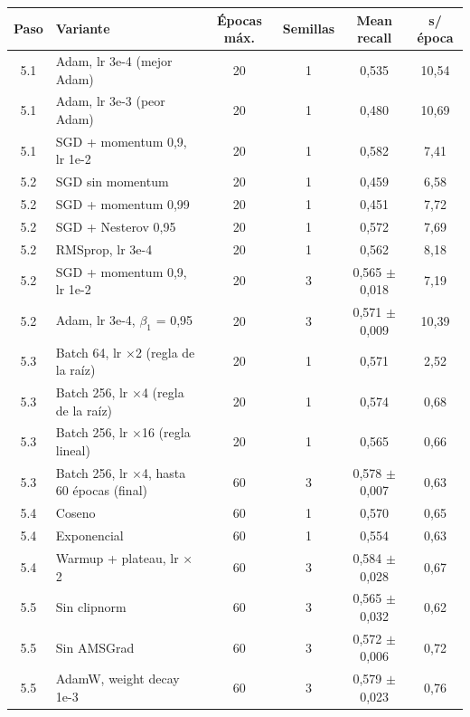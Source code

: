 \begin{tabular}{clcccc}
\toprule
Paso & Variante & Épocas máx. & Semillas & Mean recall & s/época \\
\midrule
5.1 & Adam, lr 3e-4 (mejor Adam) & 20 & 1 & 0,535 & 10,54 \\
5.1 & Adam, lr 3e-3 (peor Adam) & 20 & 1 & 0,480 & 10,69 \\
5.1 & SGD + momentum 0,9, lr 1e-2 & 20 & 1 & 0,582 & 7,41 \\
5.2 & SGD sin momentum & 20 & 1 & 0,459 & 6,58 \\
5.2 & SGD + momentum 0,99 & 20 & 1 & 0,451 & 7,72 \\
5.2 & SGD + Nesterov 0,95 & 20 & 1 & 0,572 & 7,69 \\
5.2 & RMSprop, lr 3e-4 & 20 & 1 & 0,562 & 8,18 \\
5.2 & SGD + momentum 0,9, lr 1e-2 & 20 & 3 & 0,565 $\pm$ 0,018 & 7,19 \\
5.2 & Adam, lr 3e-4, $\beta_1$ = 0,95 & 20 & 3 & 0,571 $\pm$ 0,009 & 10,39 \\
5.3 & Batch 64, lr $\times$2 (regla de la raíz) & 20 & 1 & 0,571 & 2,52 \\
5.3 & Batch 256, lr $\times$4 (regla de la raíz) & 20 & 1 & 0,574 & 0,68 \\
5.3 & Batch 256, lr $\times$16 (regla lineal) & 20 & 1 & 0,565 & 0,66 \\
5.3 & Batch 256, lr $\times$4, hasta 60 épocas (final) & 60 & 3 & 0,578 $\pm$ 0,007 & 0,63 \\
5.4 & Coseno & 60 & 1 & 0,570 & 0,65 \\
5.4 & Exponencial & 60 & 1 & 0,554 & 0,63 \\
5.4 & Warmup + plateau, lr $\times$2 & 60 & 3 & 0,584 $\pm$ 0,028 & 0,67 \\
5.5 & Sin clipnorm & 60 & 3 & 0,565 $\pm$ 0,032 & 0,62 \\
5.5 & Sin AMSGrad & 60 & 3 & 0,572 $\pm$ 0,006 & 0,72 \\
5.5 & AdamW, weight decay 1e-3 & 60 & 3 & 0,579 $\pm$ 0,023 & 0,76 \\
\bottomrule
\end{tabular}
